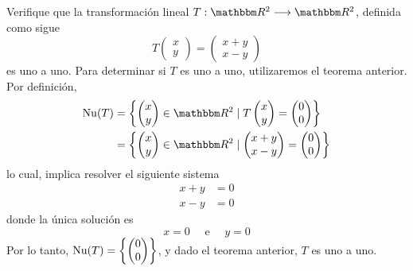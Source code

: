 \begin{example}
    Verifique que la transformación lineal $T:\RR[2] \longrightarrow \RR[2]$, definida como sigue
    $$T \begin{pmatrix}
        x \\
        y
    \end{pmatrix} = \begin{pmatrix}
        x + y \\
        x - y
    \end{pmatrix}$$
    es uno a uno. \newpage
    \solucion Para determinar si $T$ es uno a uno, utilizaremos el teorema anterior. Por definición,
    \begin{align*}
        \Nuc(T) & = \left\{ \begin{pmatrix}
            x \\
            y
        \end{pmatrix} \in \RR[2] \mid T\begin{pmatrix}
            x \\
            y
        \end{pmatrix} = \begin{pmatrix}
            0 \\
            0
        \end{pmatrix} \right\} \\
        & = \left\{ \begin{pmatrix}
            x \\
            y
        \end{pmatrix} \in \RR[2] \mid \begin{pmatrix}
            x + y \\
            x - y
        \end{pmatrix} = \begin{pmatrix}
            0 \\
            0
        \end{pmatrix} \right\}
    \end{align*}
    lo cual, implica resolver el siguiente sistema
    \begin{align*}
        x + y & = 0 \\
        x - y & = 0
    \end{align*}
    donde la única solución es
    $$x = 0 \quad \text{ e } \quad y = 0$$
    Por lo tanto, $\displaystyle \operatorname{Nu}(T) = \left\{ \begin{pmatrix}
        0 \\
        0
    \end{pmatrix} \right\}$, y dado el teorema anterior, $T$ es uno a uno.
\end{example}

